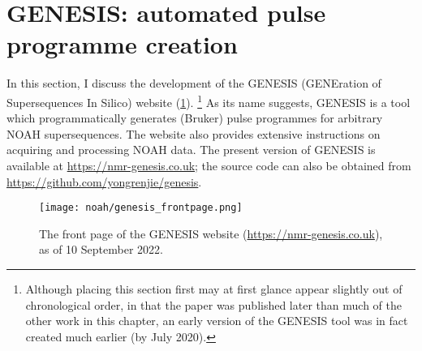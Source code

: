 \section{GENESIS: automated pulse programme creation}
\label{sec:noah__genesis}

In this section, I discuss the development of the GENESIS (GENEration of Supersequences In Silico) website (\cref{fig:genesis_frontpage}).%
\footnote{Although placing this section first may at first glance appear slightly out of chronological order, in that the paper\autocite{Yong2022AC} was published later than much of the other work in this chapter, an early version of the GENESIS tool was in fact created much earlier (by July 2020).}
As its name suggests, GENESIS is a tool which programmatically generates (Bruker) pulse programmes for arbitrary NOAH supersequences.
The website also provides extensive instructions on acquiring and processing NOAH data.
The present version of GENESIS is available at \url{https://nmr-genesis.co.uk}; the source code can also be obtained from \url{https://github.com/yongrenjie/genesis}.

\begin{figure}[!ht]
    \centering
    \texttt{[image: noah/genesis\_frontpage.png]}%
    \caption[Front page of the GENESIS website]{
        The front page of the GENESIS website (\url{https://nmr-genesis.co.uk}), as of 10 September 2022.
    }
    \label{fig:genesis_frontpage}
\end{figure}




